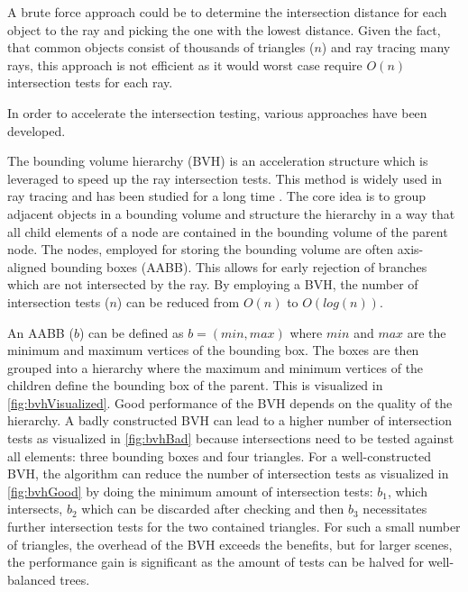 A brute force approach could be to determine the intersection distance for each object to the ray and picking the one with the lowest distance. Given the fact, that common objects consist of thousands of triangles ($n$) and ray tracing many rays, this approach is not efficient as it would worst case require $O(n)$ intersection tests for each ray.

In order to accelerate the intersection testing, various approaches have been developed.

The bounding volume hierarchy (\gls{BVH}) is an acceleration structure which is leveraged to speed up the ray intersection tests. This method is widely used in ray tracing and has been studied for a long time \cite{rubinWhittedBvh}. The core idea is to group adjacent objects in a bounding volume and structure the hierarchy in a way that all child elements of a node are contained in the bounding volume of the parent node. The nodes, employed for storing the bounding volume are often axis-aligned bounding boxes (\gls{AABB}). This allows for early rejection of branches which are not intersected by the ray. By employing a \gls{BVH}, the number of intersection tests ($n$) can be reduced from $O(n)$ to $O(log(n))$.

An \gls{AABB} ($b$) can be defined as $b = (min, max)$ where $min$ and $max$ are the minimum and maximum vertices of the bounding box. The boxes are then grouped into a hierarchy where the maximum and minimum vertices of the children define the bounding box of the parent. This is visualized in \autoref{fig:bvhVisualized}. Good performance of the \gls{BVH} depends on the quality of the hierarchy. A badly constructed \gls{BVH} can lead to a higher number of intersection tests as visualized in \autoref{fig:bvhBad} because intersections need to be tested against all elements: three bounding boxes and four triangles. For a well-constructed \gls{BVH}, the algorithm can reduce the number of intersection tests as visualized in \autoref{fig:bvhGood} by doing the minimum amount of intersection tests: $b_1$, which intersects, $b_2$ which can be discarded after checking and then $b_3$ necessitates further intersection tests for the two contained triangles. For such a small number of triangles, the overhead of the \gls{BVH} exceeds the benefits, but for larger scenes, the performance gain is significant as the amount of tests can be halved for well-balanced trees.


